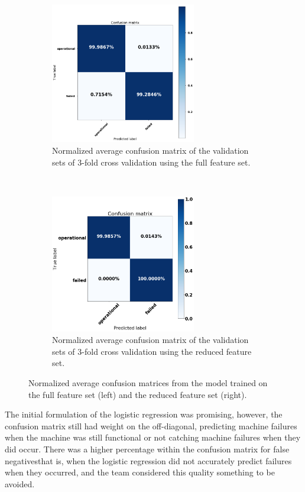 \documentclass{article}
\begin{document}
\begin{figure}[!ht]
\centering
\begin{subfigure}[!t]{0.48\textwidth}
	\centering
	\includegraphics[width=2.5in]{confusion-full-feature}
	\caption{Normalized average confusion matrix of the validation sets of 3-fold cross validation using the full feature set.}
    \label{fig:full-features-confusion-matrix}
\end{subfigure}%
~
\begin{subfigure}[!t]{0.48\textwidth}
	\centering
	\includegraphics[width=2.5in]{confusion-matrix-1-day-reduced-features}
\caption{Normalized average confusion matrix of the validation sets of 3-fold cross validation using the reduced feature set.}
\label{fig:reduced-features-confusion-matrix}
\end{subfigure}
\caption{Normalized average confusion matrices from the model trained on the full feature set (left) and the reduced feature set (right).}
\end{figure}

The initial formulation of the logistic regression was promising, however, the confusion matrix still had weight on the off-diagonal, predicting machine failures when the machine was still functional or not catching machine failures when they did occur. There was a higher percentage within the confusion matrix for false negatives\textemdash that is, when the logistic regression did not accurately predict failures when they occurred, and the team considered this quality something to be avoided.
\end{document}
